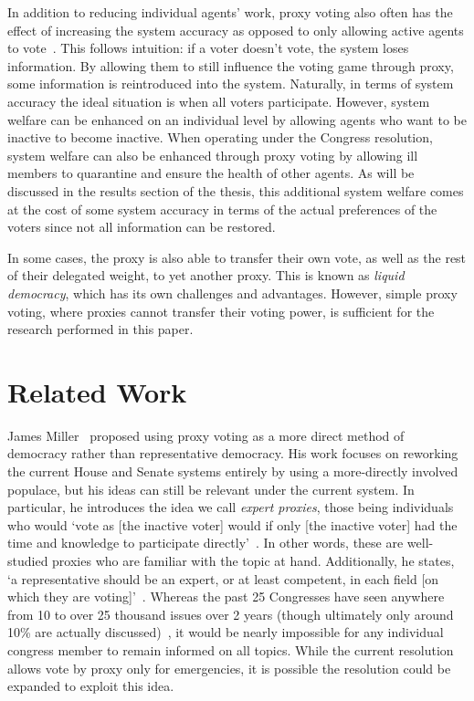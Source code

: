 In addition to reducing individual agents' work, proxy voting also often has
the effect of increasing the system accuracy as opposed to only allowing active
agents to vote~\cite{Cohensius2017}.
This follows intuition: if a voter doesn't vote, the system loses information.
By allowing them to still influence the voting game through proxy, some information
is reintroduced into the system.
Naturally, in terms of system accuracy the ideal situation is when all voters
participate.
However, system welfare can be enhanced on an individual level by allowing agents
who want to be inactive to become inactive.
When operating under the Congress resolution, system welfare can also be enhanced
through proxy voting by allowing ill members to quarantine and ensure the health
of other agents.
As will be discussed in the results section of the thesis,
this additional system welfare comes at
the cost of some system accuracy in terms of the actual preferences of the voters
since not all information can be restored.

In some cases, the proxy is also able to transfer their own vote, as well as the rest of
their delegated weight, to yet another proxy.
This is known as \textit{liquid democracy}, which has its own challenges and
advantages.
However, simple proxy voting, where proxies cannot transfer their voting power,
is sufficient for the research performed in this paper.


\section{Related Work}\label{sec:related-work}
James Miller~\cite{Miller1969} proposed using proxy voting as a more direct
method of democracy rather than representative democracy.
His work focuses on reworking the current House and Senate systems entirely by using a
more-directly involved populace, but his ideas can still be relevant under the current
system.
In particular, he introduces the idea we call \textit{expert proxies},
those being individuals who would `vote as [the inactive voter] would if only
[the inactive voter] had the time and knowledge to participate
directly'~\cite[para.~1.3]{Miller1969}.
In other words, these are well-studied proxies who are familiar with the topic at hand.
Additionally, he states, `a representative should be an expert, or at least
competent, in each field [on which they are voting]'~\cite[para.~2.7]{Miller1969}.
Whereas the past 25 Congresses have seen anywhere from 10 to over 25 thousand issues
over 2 years (though ultimately only around 10\% are actually
discussed)~\cite{GovTrack2022}, it would be nearly impossible for any individual
congress member to remain informed on all topics.
While the current resolution allows vote by proxy only for emergencies, it is
possible the resolution could be expanded to exploit this idea.

